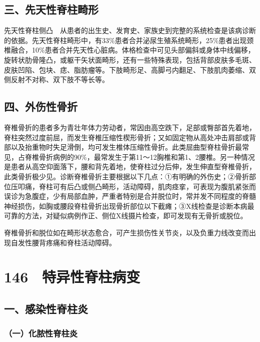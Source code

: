 \subsection{三、先天性脊柱畸形}

先天性脊柱侧凸　从患者的出生史、发育史、家族史到完整的系统检查是该病诊断的依据。先天性脊柱畸形中，有33\%患者合并泌尿生殖系统畸形，25\%患者出现颈椎融合，10\%患者合并先天性心脏病。体格检查中可见头部偏斜或身体中线偏移，旋转状肋骨隆凸，或躯干矢状面畸形，还有一些特殊表现，包括背部皮肤多毛斑、皮肤凹陷、包块、痣、脂肪瘤等。下肢畸形足、高脚弓内翻足、下肢肌肉萎缩、双侧反射不对称、双下肢不等长等。

\subsection{四、外伤性骨折}

脊椎骨折的患者多为青壮年体力劳动者，常因由高空跌下，足部或臀部首先着地，脊柱突然过度前屈，而发生脊椎压缩性楔形骨折；又如固定物从高处冲击肩部或背部以及抬重物时失足滑倒，均可发生椎体压缩性骨折。此类屈曲型脊柱骨折最常见，占脊椎骨折病例的90\%，最常发生于第11～12胸椎和第1、2腰椎。另一种情况是患者从高空仰面落下，腰和背先着地，使脊柱过分后伸，发生伸直型脊椎骨折，此类骨折极少见。诊断脊椎骨折主要根据以下几点：①有明确的外伤史；②骨折部位压叩痛，脊柱可有后凸或侧凸畸形，活动障碍，肌肉痉挛，可表现为腹肌紧张而误诊为急腹症，少有局部血肿，严重者特别是合并脱位时，常并发不同程度的脊髓神经损伤，如胸或腰段脊柱骨折出现骨折部位以下截瘫；③X线检查是诊断本病最可靠的方法，对疑似病例作正、侧位X线摄片检查，即可发现有无骨折或脱位。

脊椎骨折和脱位如在畸形状态愈合，可产生损伤性关节炎，以及负重力线改变而出现自发性腰背疼痛和脊柱活动障碍。

\protect\hypertarget{text00334.html}{}{}

\section{146　特异性脊柱病变}

\subsection{一、感染性脊柱炎}

\subsubsection{（一）化脓性脊柱炎}

